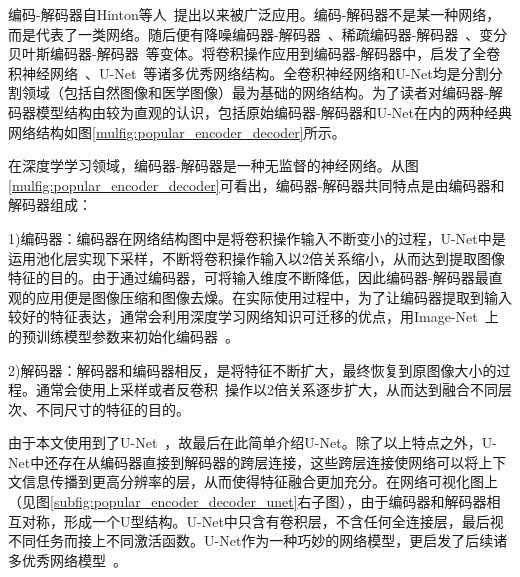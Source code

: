 编码-解码器自Hinton等人~\cite{hinton2006reducing}提出以来被广泛应用。编码-解码器不是某一种网络，而是代表了一类网络。随后便有降噪编码器-解码器~\cite{vincent2008extracting}、稀疏编码器-解码器~\cite{coates2011analysis}、变分贝叶斯编码器-解码器~\cite{kingma2013auto}等变体。将卷积操作应用到编码器-解码器中，启发了全卷积神经网络~\cite{long2015fully}、U-Net~\cite{ronneberger2015u}等诸多优秀网络结构。全卷积神经网络和U-Net均是分割分割领域（包括自然图像和医学图像）最为基础的网络结构。为了读者对编码器-解码器模型结构由较为直观的认识，包括原始编码器-解码器和U-Net在内的两种经典网络结构如图\ref{mulfig:popular_encoder_decoder}所示。

在深度学学习领域，编码器-解码器是一种无监督的神经网络。从图\ref{mulfig:popular_encoder_decoder}可看出，编码器-解码器共同特点是由编码器和解码器组成：

1)编码器：编码器在网络结构图中是将卷积操作输入不断变小的过程，U-Net中是运用池化层实现下采样，不断将卷积操作输入以2倍关系缩小，从而达到提取图像特征的目的。由于通过编码器，可将输入维度不断降低，因此编码器-解码器最直观的应用便是图像压缩和图像去燥。在实际使用过程中，为了让编码器提取到输入较好的特征表达，通常会利用深度学习网络知识可迁移的优点，用Image-Net~\cite{deng2009imagenet}上的预训练模型参数来初始化编码器~\cite{iglovikov2018ternausnet}。

2)解码器：解码器和编码器相反，是将特征不断扩大，最终恢复到原图像大小的过程。通常会使用上采样或者反卷积~\cite{zeiler2010deconvolutional}操作以2倍关系逐步扩大，从而达到融合不同层次、不同尺寸的特征的目的。

由于本文使用到了U-Net~\cite{ronneberger2015u}，故最后在此简单介绍U-Net。除了以上特点之外，U-Net中还存在从编码器直接到解码器的跨层连接，这些跨层连接使网络可以将上下文信息传播到更高分辨率的层，从而使得特征融合更加充分。在网络可视化图上（见图\ref{subfig:popular_encoder_decoder_unet}右子图），由于编码器和解码器相互对称，形成一个U型结构。U-Net中只含有卷积层，不含任何全连接层，最后视不同任务而接上不同激活函数。U-Net作为一种巧妙的网络模型，更启发了后续诸多优秀网络模型~\cite{zhou2018unet++, oktay2018attention, ibtehaz2020multiresunet, alom2019recurrent, milletari2016v}。


